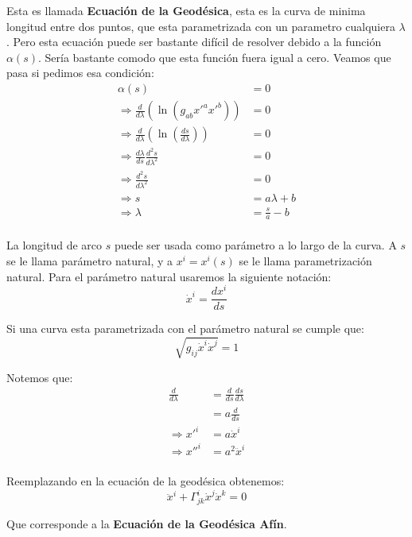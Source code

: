 \documentclass[paper=a4, fontsize=11pt,twoside]{scrartcl}
\begin{document}
Esta es llamada \textbf{Ecuaci\'on de la Geod\'esica}, esta es la curva de minima longitud entre dos puntos, que esta parametrizada 
con un parametro cualquiera $\lambda$. Pero esta ecuaci\'on puede ser bastante dif\'icil de resolver debido a la funci\'on $\alpha(s)$. 
Ser\'ia bastante comodo que esta funci\'on fuera igual a cero. Veamos que pasa si pedimos esa condici\'on:
	\begin{align*}
		\alpha(s) &= 0 \\
		\Rightarrow \frac{d}{d\lambda} \left( \ln \left( g_{ab} x'^{a}x'^{b}\right) \right) &= 0 \\
		\Rightarrow \frac{d}{d\lambda} \left( \ln \left( \frac{ds}{d\lambda }\right) \right) &= 0 \\
		\Rightarrow \frac{d\lambda}{ds}\frac{d^{2}s}{d\lambda^{2}} &= 0 \\
		\Rightarrow \frac{d^{2}s}{d\lambda^{2}} &= 0 \\
		\Rightarrow s &= a \lambda + b \\  
		\Rightarrow \lambda &= \frac{s}{a} - b \\
	\end{align*}

La longitud de arco $s$ puede ser usada como par\'ametro a lo largo de la curva. A $s$ se le llama par\'ametro natural, y a $x^{i} = x^{i}(s)$ 
se le llama parametrizaci\'on natural. Para el par\'ametro natural usaremos la siguiente notaci\'on:
	\begin{equation*}
		\dot{x}^{i} = \frac{dx^{i}}{ds}
	\end{equation*}

Si una curva esta parametrizada con el par\'ametro natural se cumple que:
	\begin{equation*}
		 \sqrt{g_{ij}\dot{x}^{i} \dot{x}^{j}} = 1
	\end{equation*}

Notemos que:
	\begin{align*}
		\frac{d}{d\lambda} &= \frac{d}{ds}\frac{ds}{d\lambda} \\ 
						   &= a\frac{d}{ds} \\
		\Rightarrow x'^{i} &= a \dot{x}^{i} \\
		\Rightarrow x''^{i} &= a^{2} \ddot{x}^{i} \\
 	\end{align*}
	
Reemplazando en la ecuaci\'on de la geod\'esica	obtenemos:
	\begin{equation*}
		\ddot{x}^{i} + \Gamma^{i}_{jk} \dot{x}^{j}\dot{x}^{k} = 0
	\end{equation*}

Que corresponde a la \textbf{ Ecuaci\'on de la Geod\'esica Af\'in}.
\end{document}
